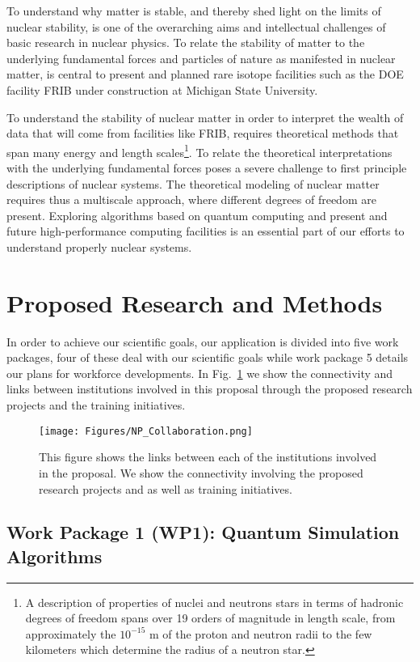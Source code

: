 \documentclass[10pt]{article}
\begin{document}
To understand why matter is stable, and thereby shed light on the
limits of nuclear stability, is one of the overarching aims and
intellectual challenges of basic research in nuclear physics. To
relate the stability of matter to the underlying fundamental forces
and particles of nature as manifested in nuclear matter, is central to
present and planned rare isotope facilities such as the DOE facility
FRIB under construction at Michigan State University.

To understand the stability of nuclear matter in order to interpret
the wealth of data that will come from facilities like FRIB, requires
theoretical methods that span many energy and length scales\footnote{A
  description of properties of nuclei and neutrons stars in terms of
  hadronic degrees of freedom spans over 19 orders of magnitude in
  length scale, from approximately the $10^{-15}$ m of the proton and
  neutron radii to the few kilometers which determine the radius of a
  neutron star.}. To relate the theoretical interpretations with the
underlying fundamental forces poses a severe challenge to first
principle descriptions of nuclear systems.  The theoretical modeling
of nuclear matter requires thus a multiscale approach, where different
degrees of freedom are present. Exploring algorithms based on quantum
computing and present and future high-performance computing facilities
is an essential part of our efforts to understand properly nuclear
systems.


\section{Proposed Research and Methods}

In order to achieve our scientific goals, our application is divided into five work packages, four of these deal with our scientific goals while work package 5 details our plans for workforce developments.  In Fig.~\ref{diagram} we show the connectivity and links between institutions involved in this proposal through the proposed research projects and the training initiatives.
\begin{figure}[hbtp]
 \texttt{[image: Figures/NP\_Collaboration.png]}
 \caption{This figure shows the links between each of the institutions involved in the proposal.  We show the connectivity involving the proposed research projects and as well as training initiatives.}
 \label{diagram}
\end{figure}


\subsection{Work Package 1 (WP1): Quantum Simulation Algorithms}
\end{document}
